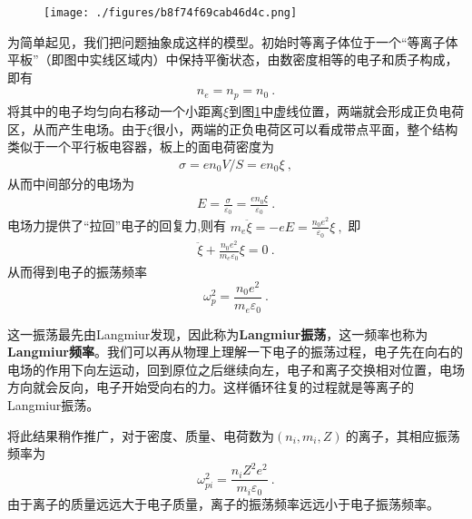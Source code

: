 \begin{figure}[ht]
\centering
\texttt{[image: ./figures/b8f74f69cab46d4c.png]}
\caption{} \label{fig_Plasma_1}
\end{figure}

为简单起见，我们把问题抽象成这样的模型。初始时等离子体位于一个“等离子体平板”（即图中实线区域内）中保持平衡状态，由数密度相等的电子和质子构成，即有
			\begin{align}
				n_e=n_p=n_0~.
			\end{align}
			将其中的电子均匀向右移动一个小距离$\xi$到图\ref{fig_Plasma_1}中虚线位置，两端就会形成正负电荷区，从而产生电场。由于$\xi$很小，两端的正负电荷区可以看成带点平面，整个结构类似于一个平行板电容器，板上的面电荷密度为
			\begin{align}
			\sigma=en_0V/S=en_0\xi~,
			\end{align}
			从而中间部分的电场为
			\begin{align}
			E=\frac{\sigma}{\varepsilon_0}=\frac{en_0\xi}{\varepsilon_0}~.
			\end{align}
			电场力提供了“拉回”电子的回复力,则有
			$m_e\ddot{\xi}=-eE=\frac{n_0e^2}{\varepsilon_0}\xi~,$
			即
			\begin{align}
			\ddot{\xi}+\frac{n_0e^2}{m_e\varepsilon_0}\xi=0~.
			\end{align}
			从而得到电子的振荡频率
			\begin{equation}
			\boxed{\omega_p^2=\frac{n_0e^2}{m_e\varepsilon_0}}~.
			\end{equation}
			
			这一振荡最先由Langmiur发现，因此称为\textbf{Langmiur振荡}，这一频率也称为\textbf{Langmiur频率}。我们可以再从物理上理解一下电子的振荡过程，电子先在向右的电场的作用下向左运动，回到原位之后继续向左，电子和离子交换相对位置，电场方向就会反向，电子开始受向右的力。这样循环往复的过程就是等离子的Langmiur振荡。
			
			将此结果稍作推广，对于密度、质量、电荷数为$(n_i,m_i,Z)~$的离子，其相应振荡频率为
			\begin{equation}
			\omega_{pi}^2=\frac{n_i Z^2e^2}{m_i\varepsilon_0}~.
			\end{equation}
			由于离子的质量远远大于电子质量，离子的振荡频率远远小于电子振荡频率。






